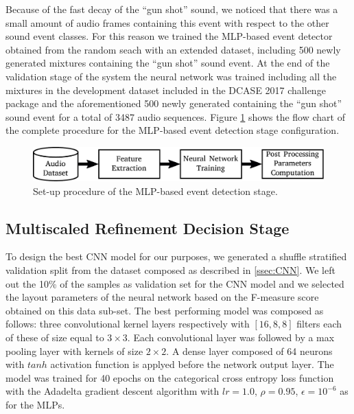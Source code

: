 \documentclass{article}
\begin{document}
\begin{sloppy}
Because of the fast decay of the ``gun shot'' sound, we noticed that there was a small amount of audio frames containing this event with respect to the other sound event classes. For this reason we trained the MLP-based event detector obtained from the random seach with an extended dataset, including 500 newly generated mixtures containing the ``gun shot'' sound event.
At the end of the validation stage of the system the neural network was trained including all the mixtures in the development dataset included in the DCASE 2017 challenge package and the aforementioned 500 newly generated containing the ``gun shot'' sound event for a total of 3487 audio sequences. Figure \ref{fig:MLP-train} shows the flow chart of the complete procedure for the MLP-based event detection stage configuration.

\begin{figure}[t]
	\centering
	\includegraphics[width=\columnwidth]{Images/training_first_stage.pdf}
	\caption{Set-up procedure of the MLP-based event detection stage.}
	\label{fig:MLP-train}
\end{figure}

\subsection{Multiscaled Refinement Decision Stage}

%

To design the best CNN model for our purposes, we generated a shuffle stratified validation split from the dataset composed as described in \ref{ssec:CNN}. We left out the 10\% of the samples as validation set for the CNN model and we selected the layout parameters of the neural network based on the F-measure score obtained on this data sub-set. The best performing model was composed as follows: three convolutional kernel layers respectively with $[16, 8, 8]$ filters each of these of size equal to $3\times3$. Each convolutional layer was followed by a max pooling layer with kernels of size $2\times2$. A dense layer composed of 64 neurons with $tanh$ activation function is applyed before the network output layer. The model was trained for 40 epochs on the categorical cross entropy loss function with the Adadelta gradient descent algorithm with $lr=1.0$, $\rho=0.95$, $\epsilon=10^{-6}$ as for the MLPs.



\end{sloppy}
\end{document}
